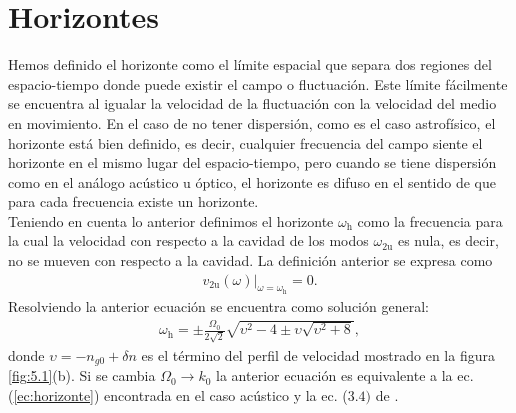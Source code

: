 \section{Horizontes}
Hemos definido el horizonte como el l\'{i}mite espacial que separa dos regiones del espacio-tiempo donde puede existir el campo o fluctuaci\'{o}n. Este l\'{i}mite f\'{a}cilmente se encuentra al igualar la velocidad de la fluctuaci\'{o}n con la velocidad del medio en movimiento. En el caso de no tener dispersi\'{o}n, como es el caso astrof\'{i}sico, el horizonte est\'{a} bien definido, es decir, cualquier frecuencia del campo siente el horizonte en el mismo lugar del espacio-tiempo, pero cuando se tiene dispersi\'{o}n como en el an\'{a}logo ac\'{u}stico u \'{o}ptico, el horizonte es difuso en el sentido de que para cada frecuencia existe un horizonte.\\

Teniendo en cuenta lo anterior definimos el horizonte $\omega_\text{h}$ como la frecuencia para la cual la velocidad con respecto a la cavidad de los modos $\omega_{\text{2u}}$ es nula, es decir, no se mueven con respecto a la cavidad. La definici\'{o}n anterior se expresa como
\begin{align}
v_{\text{2u}}(\omega)|_{\omega=\omega_{\text{h}}}=0.
\end{align}
Resolviendo la anterior ecuaci\'{o}n se encuentra como soluci\'{o}n general:
\begin{align}
\omega_{\text{h}}=\pm\frac{\Omega_0}{2\sqrt{2}}\sqrt{\upsilon^2-4\pm \upsilon\sqrt{\upsilon^2+8}},
\end{align}
donde $\upsilon=-n_{g0}+\delta n$ es el t\'{e}rmino del perfil de velocidad mostrado en la figura \ref{fig:5.1}(b). Si se cambia $\Omega_0\rightarrow k_0$ la anterior  ecuaci\'{o}n  es equivalente a la ec.(\ref{ec:horizonte}) encontrada en el caso ac\'{u}stico y la ec. ($3.4)$ de \cite{2018Bermudez}.
